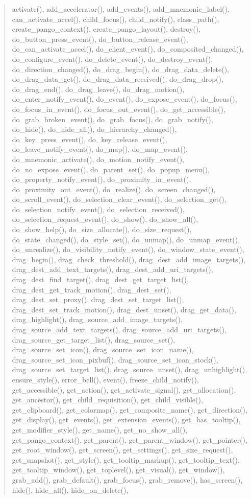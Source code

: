 \begin{quote}
activate(), add\_accelerator(), add\_events(), add\_mnemonic\_label(), can\_activate\_accel(), child\_focus(), child\_notify(), class\_path(), create\_pango\_context(), create\_pango\_layout(), destroy(), do\_button\_press\_event(), do\_button\_release\_event(), do\_can\_activate\_accel(), do\_client\_event(), do\_composited\_changed(), do\_configure\_event(), do\_delete\_event(), do\_destroy\_event(), do\_direction\_changed(), do\_drag\_begin(), do\_drag\_data\_delete(), do\_drag\_data\_get(), do\_drag\_data\_received(), do\_drag\_drop(), do\_drag\_end(), do\_drag\_leave(), do\_drag\_motion(), do\_enter\_notify\_event(), do\_event(), do\_expose\_event(), do\_focus(), do\_focus\_in\_event(), do\_focus\_out\_event(), do\_get\_accessible(), do\_grab\_broken\_event(), do\_grab\_focus(), do\_grab\_notify(), do\_hide(), do\_hide\_all(), do\_hierarchy\_changed(), do\_key\_press\_event(), do\_key\_release\_event(), do\_leave\_notify\_event(), do\_map(), do\_map\_event(), do\_mnemonic\_activate(), do\_motion\_notify\_event(), do\_no\_expose\_event(), do\_parent\_set(), do\_popup\_menu(), do\_property\_notify\_event(), do\_proximity\_in\_event(), do\_proximity\_out\_event(), do\_realize(), do\_screen\_changed(), do\_scroll\_event(), do\_selection\_clear\_event(), do\_selection\_get(), do\_selection\_notify\_event(), do\_selection\_received(), do\_selection\_request\_event(), do\_show(), do\_show\_all(), do\_show\_help(), do\_size\_allocate(), do\_size\_request(), do\_state\_changed(), do\_style\_set(), do\_unmap(), do\_unmap\_event(), do\_unrealize(), do\_visibility\_notify\_event(), do\_window\_state\_event(), drag\_begin(), drag\_check\_threshold(), drag\_dest\_add\_image\_targets(), drag\_dest\_add\_text\_targets(), drag\_dest\_add\_uri\_targets(), drag\_dest\_find\_target(), drag\_dest\_get\_target\_list(), drag\_dest\_get\_track\_motion(), drag\_dest\_set(), drag\_dest\_set\_proxy(), drag\_dest\_set\_target\_list(), drag\_dest\_set\_track\_motion(), drag\_dest\_unset(), drag\_get\_data(), drag\_highlight(), drag\_source\_add\_image\_targets(), drag\_source\_add\_text\_targets(), drag\_source\_add\_uri\_targets(), drag\_source\_get\_target\_list(), drag\_source\_set(), drag\_source\_set\_icon(), drag\_source\_set\_icon\_name(), drag\_source\_set\_icon\_pixbuf(), drag\_source\_set\_icon\_stock(), drag\_source\_set\_target\_list(), drag\_source\_unset(), drag\_unhighlight(), ensure\_style(), error\_bell(), event(), freeze\_child\_notify(), get\_accessible(), get\_action(), get\_activate\_signal(), get\_allocation(), get\_ancestor(), get\_child\_requisition(), get\_child\_visible(), get\_clipboard(), get\_colormap(), get\_composite\_name(), get\_direction(), get\_display(), get\_events(), get\_extension\_events(), get\_has\_tooltip(), get\_modifier\_style(), get\_name(), get\_no\_show\_all(), get\_pango\_context(), get\_parent(), get\_parent\_window(), get\_pointer(), get\_root\_window(), get\_screen(), get\_settings(), get\_size\_request(), get\_snapshot(), get\_style(), get\_tooltip\_markup(), get\_tooltip\_text(), get\_tooltip\_window(), get\_toplevel(), get\_visual(), get\_window(), grab\_add(), grab\_default(), grab\_focus(), grab\_remove(), has\_screen(), hide(), hide\_all(), hide\_on\_delete(), 
\end{quote}

